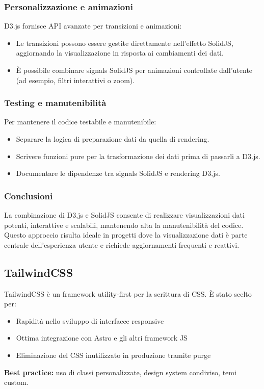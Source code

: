 \subsubsection{Personalizzazione e animazioni}

D3.js fornisce API avanzate per transizioni e animazioni:
\begin{itemize}
    \item Le transizioni possono essere gestite direttamente nell’effetto SolidJS, aggiornando la visualizzazione in risposta ai cambiamenti dei dati.
    \item È possibile combinare signals SolidJS per animazioni controllate dall’utente (ad esempio, filtri interattivi o zoom).
\end{itemize}

\subsubsection{Testing e manutenibilità}

Per mantenere il codice testabile e manutenibile:
\begin{itemize}
    \item Separare la logica di preparazione dati da quella di rendering.
    \item Scrivere funzioni pure per la trasformazione dei dati prima di passarli a D3.js.
    \item Documentare le dipendenze tra signals SolidJS e rendering D3.js.
\end{itemize}


\subsubsection{Conclusioni}

La combinazione di D3.js e SolidJS consente di realizzare visualizzazioni dati potenti, interattive e scalabili, mantenendo alta la manutenibilità del codice. Questo approccio risulta ideale in progetti dove la visualizzazione dati è parte centrale dell’esperienza utente e richiede aggiornamenti frequenti e reattivi.

\subsection{TailwindCSS}
TailwindCSS è un framework utility-first per la scrittura di CSS. È stato scelto per:
\begin{itemize}
    \item Rapidità nello sviluppo di interfacce responsive
    \item Ottima integrazione con Astro e gli altri framework JS
    \item Eliminazione del CSS inutilizzato in produzione tramite purge
\end{itemize}
\textbf{Best practice:} uso di classi personalizzate, design system condiviso, temi custom.

